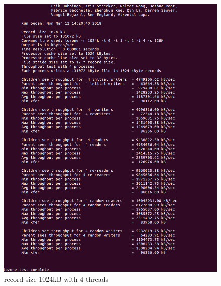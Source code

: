 \documentclass[12pt]{article}
\begin{document}
     \begin{figure}[H]
        \centering
       \includegraphics[scale=0.4]{1024kB 4 proccesses.png}
       \caption{record size 1024kB with 4 threads}
    \end{figure}
\end{document}
